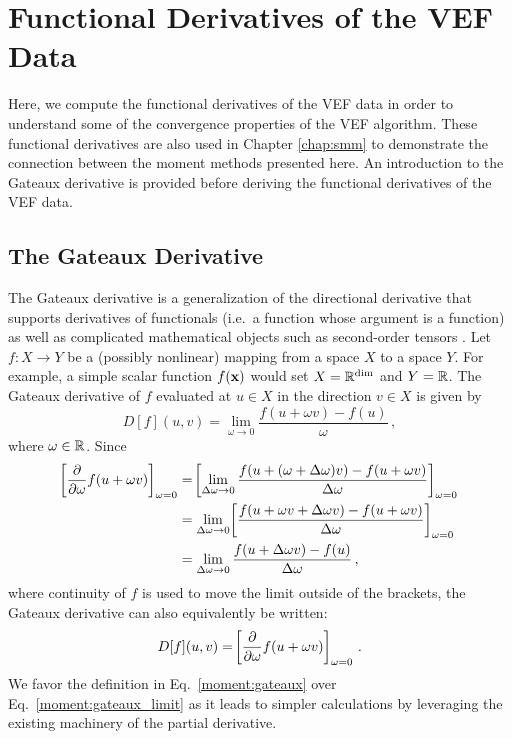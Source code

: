 \documentclass[../doc.tex]{subfiles}
\begin{document}
\section{Functional Derivatives of the VEF Data} \label{moment_sec:gateaux}
Here, we compute the functional derivatives of the VEF data in order to understand some of the convergence properties of the VEF algorithm. These functional derivatives are also used in Chapter \ref{chap:smm} to demonstrate the connection between the moment methods presented here. An introduction to the Gateaux derivative is provided before deriving the functional derivatives of the VEF data. 

\subsection{The Gateaux Derivative}
The Gateaux derivative is a generalization of the directional derivative that supports derivatives of functionals (i.e.~a function whose argument is a function) as well as complicated mathematical objects such as second-order tensors \cite{vainberg64}. Let $f : X\rightarrow Y$ be a (possibly nonlinear) mapping from a space $X$ to a space $Y$. For example, a simple scalar function $f(\boldsymbol{\mathrm{x}})$ would set $X = \mathbb{R}^{\dim}$ and $Y = \mathbb{R}$. The Gateaux derivative of $f$ evaluated at $u\in X$ in the direction $v \in X$ is given by 
	\begin{equation} \label{moment:gateaux_limit}
		D[f](u,v) = \lim_{\omega\rightarrow 0} \frac{f(u+\omega v) - f(u)}{\omega} \,,
	\end{equation}
where $\omega\in \mathbb{R}$. Since 
	\begin{equation}
	\begin{aligned}
		\!\left[ \frac{\partial }{\partial \omega}f(u + \omega v) \right]_{\omega=0} &= \!\left[ \lim_{\Delta\omega \rightarrow 0} \frac{f(u+(\omega+\Delta\omega)v) - f(u + \omega v)}{\Delta\omega} \right]_{\omega=0} \\
		&= \lim_{\Delta\omega \rightarrow 0}\!\left[ \frac{f(u + \omega v + \Delta\omega v) - f(u + \omega v)}{\Delta\omega} \right]_{\omega=0} \\
		&= \lim_{\Delta\omega\rightarrow 0} \frac{f(u + \Delta\omega v) - f(u)}{\Delta\omega} \,,
	\end{aligned}
	\end{equation}
where continuity of $f$ is used to move the limit outside of the brackets, the Gateaux derivative can also equivalently be written: 
	\begin{equation} \label{moment:gateaux}
		D[f](u,v) = \!\left[ \frac{\partial }{\partial \omega}f(u + \omega v) \right]_{\omega=0} \,. 
	\end{equation}
We favor the definition in Eq.~\ref{moment:gateaux} over Eq.~\ref{moment:gateaux_limit} as it leads to simpler calculations by leveraging the existing machinery of the partial derivative. 
\end{document}
